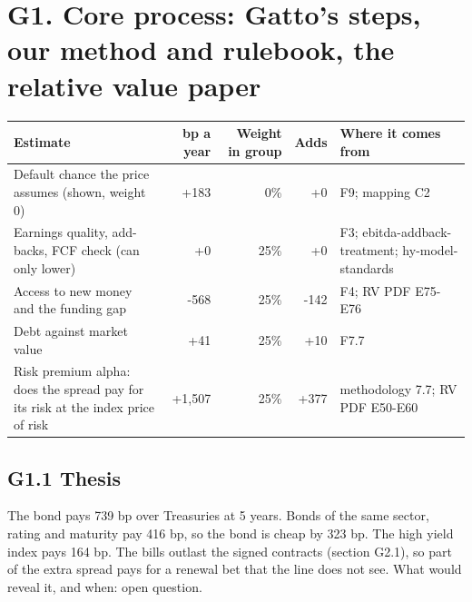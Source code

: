 \documentclass[11pt,a4paper]{article}
\begin{document}
\section*{G1. Core process: Gatto's steps, our method and rulebook, the relative value paper}
\par\noindent{}
\begin{center}\footnotesize\setlength{\tabcolsep}{3.5pt}\begin{tabular}{@{}p{6.2cm}rrrp{4.2cm}@{}}\toprule
Estimate & bp a year & Weight in group & Adds & Where it comes from \\\midrule
Default chance the price assumes (shown, weight 0) & +183 & 0\% & +0 & F9; mapping C2 \\
Earnings quality, add-backs, FCF check (can only lower) & +0 & 25\% & +0 & F3; ebitda-addback-treatment; hy-model-standards \\
Access to new money and the funding gap & -568 & 25\% & -142 & F4; RV PDF E75-E76 \\
Debt against market value & +41 & 25\% & +10 & F7.7 \\
Risk premium alpha: does the spread pay for its risk at the index price of risk & +1,507 & 25\% & +377 & methodology 7.7; RV PDF E50-E60 \\
\bottomrule\end{tabular}\end{center}
\subsection*{G1.1 Thesis}
The bond pays 739 bp over Treasuries at 5 years. Bonds of the same sector, rating and maturity pay 416 bp, so the bond is cheap by 323 bp. The high yield index pays 164 bp. The bills outlast the signed contracts (section G2.1), so part of the extra spread pays for a renewal bet that the line does not see. What would reveal it, and when: open question.
\end{document}
